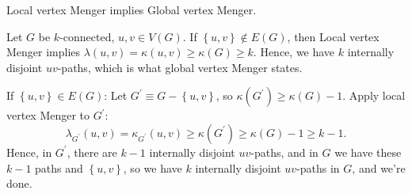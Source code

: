 \begin{claim}
        Local vertex Menger implies Global vertex Menger.
    \end{claim}
    \begin{explanation}
        Let \(G\) be \(k\)-connected, \(u, v \in V(G)\). If \(\left\{ u, v \right\} \notin E(G) \), then Local vertex Menger implies \(\lambda (u, v) = \kappa (u, v) \ge \kappa (G) \ge k\). Hence, we have \(k\) internally disjoint \(uv\)-paths, which is what global vertex Menger states. 

        If \(\left\{ u, v \right\} \in E(G) \): Let \(G^{\prime} \equiv  G - \left\{ u, v \right\} \), so \(\kappa (G^{\prime} ) \ge \kappa (G) - 1\). Apply local vertex Menger to \(G^{\prime} \):
        \[
            \lambda _{G^{\prime} }(u, v) = \kappa_{G^{\prime} }(u, v) \ge \kappa (G^{\prime} ) \ge \kappa (G) - 1 \ge k - 1.
        \]         
        Hence, in \(G^{\prime}\), there are \(k - 1\) internally disjoint \(uv\)-paths, and in \(G\) we have these \(k - 1\) paths and \(\left\{ u, v \right\} \), so we have \(k\) internally disjoint \(uv\)-paths in \(G\), and we're done.        
    \end{explanation}